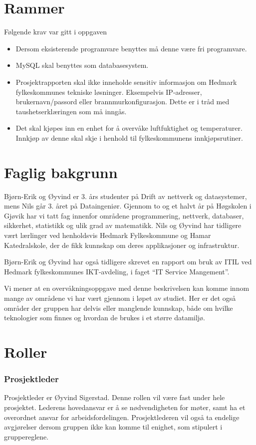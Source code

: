 \section{Rammer}
Følgende krav var gitt i oppgaven
\begin{itemize}
	\item Dersom eksisterende programvare benyttes må denne være fri programvare.
	\item MySQL skal benyttes som databasesystem.
	\item Prosjektrapporten skal ikke inneholde sensitiv informasjon om Hedmark fylkeskommunes tekniske løsninger. Eksempelvis IP-adresser, brukernavn/passord eller brannmurkonfigurasjon. Dette er i tråd med taushetserklæringen som må inngås.
	\item Det skal kjøpes inn en enhet for å overvåke luftfuktighet og temperaturer. Innkjøp av denne skal skje i henhold til fylkeskommunens innkjøpsrutiner.
\end{itemize}

\section{Faglig bakgrunn}
Bjørn-Erik og Øyvind er 3. års studenter på Drift av nettverk og datasystemer, mens Nils går 3. året på Dataingeniør. Gjennom to og et halvt år på Høgskolen i Gjøvik har vi tatt fag innenfor områdene programmering, nettverk, databaser, sikkerhet, statistikk og ulik grad av matematikk. Nils og Øyvind har tidligere vært lærlinger ved henholdsvis Hedmark Fylkeskommune og Hamar Katedralskole, der de fikk kunnskap om deres applikasjoner og infrastruktur.

Bjørn-Erik og Øyvind har også tidligere skrevet en rapport om bruk av ITIL ved Hedmark fylkeskommunes IKT-avdeling, i faget ``IT Service Mangement''.

Vi mener at en overvåkningsoppgave med denne beskrivelsen kan komme innom mange av områdene vi har vært gjennom i løpet av studiet. Her er det også områder der gruppen har delvis eller manglende kunnskap, både om hvilke teknologier som finnes og hvordan de brukes i et større datamiljø.

\section{Roller}
\subsubsection{Prosjektleder}
Prosjektleder er Øyvind Sigerstad. Denne rollen vil være fast under hele prosjektet. Lederens hovedansvar er å se nødvendigheten for møter, samt ha et overordnet ansvar for arbeidsfordelingen. Prosjektlederen vil også ta endelige avgjørelser dersom gruppen ikke kan komme til enighet, som stipulert i gruppereglene.


